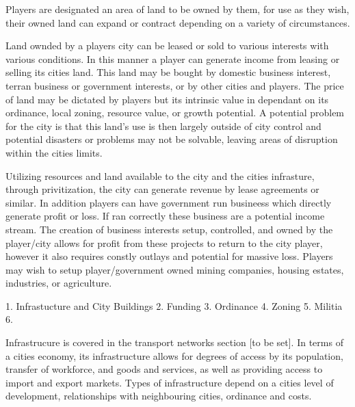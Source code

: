 Players are designated an area of land to be owned by them, for use as they wish, their owned land can expand or contract depending on a variety of circumstances. 

Land ownded by a players city can be leased or sold to various interests with various conditions. In this manner a player can generate income from leasing or selling its cities land. This land may be bought by domestic business interest, terran business or government interests, or by other cities and players. The price of land may be dictated by players but its intrinsic value in dependant on its ordinance, local zoning, resource value, or growth potential. %
A potential problem for the city is that this land's use is then largely outside of city control and potential disasters or problems may not be solvable, leaving areas of disruption within the cities limits.


Utilizing resources and land available to the city and the cities infrasture, through privitization, the city can generate revenue by lease agreements or similar. In addition players can have government run busineess which directly generate profit or loss. If ran correctly these business are a potential income stream. 
The creation of business interests setup, controlled, and owned by the player/city allows for profit from these projects to return to the city player, however it also requires constly outlays and potential for massive loss. Players may wish to setup player/government owned mining companies, housing estates, industries, or agriculture. 













1.  Infrastucture and City Buildings
2.  Funding
3.  Ordinance
4.  Zoning
5.  Militia
6.  







Infrastrucure is covered in the transport networks section [to be set]. In terms of a cities economy, its infrastructure allows for degrees of access by its population, transfer of workforce, and goods and services, as well as providing access to import and export markets. Types of infrastructure depend on a cities level of development, relationships with neighbouring cities, ordinance and costs. 


